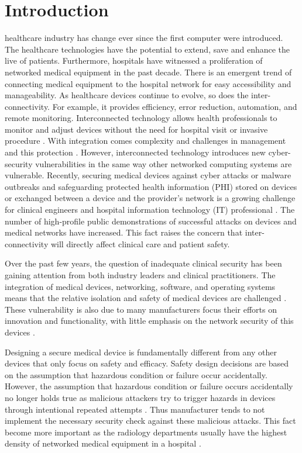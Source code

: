 \documentclass[pdf,bookmarks,colorlinks=true]{IEEEtran}
\begin{document}
\section{Introduction}
 healthcare industry has change ever since the first computer were introduced. The healthcare technologies have the potential to extend, save and enhance the live of patients. Furthermore, hospitals have witnessed a proliferation of networked medical equipment in the past decade. There is an emergent trend of connecting medical equipment to the hospital network for easy accessibility and manageability. As healthcare devices continue to evolve, so does the inter-connectivity. For example, it provides efficiency, error reduction, automation, and remote monitoring. Interconnected technology allows health professionals to monitor and adjust devices without the need for hospital visit or invasive procedure \cite{coventry2018cybersecurity}. With integration comes complexity and challenges in management and this protection \cite{williams2015cybersecurity}. However, interconnected technology introduces new cyber-security vulnerabilities in the same way other networked computing systems are vulnerable. Recently, securing medical devices against cyber attacks or malware outbreaks and safeguarding protected health information (PHI) stored on devices or exchanged between a device and the provider's network is a growing challenge for clinical engineers and hospital information technology (IT) professional \cite{wirth2011cybercrimes}. The number of high-profile public demonstrations of successful attacks on devices and medical networks have increased. This fact raises the concern that inter-connectivity will directly affect clinical care and patient safety. \par
Over the past few years, the question of inadequate clinical security has been gaining attention from both industry leaders and clinical practitioners. The integration of medical devices, networking, software, and operating systems means that the relative isolation and safety of medical devices are challenged \cite{williams2015cybersecurity}. These vulnerability is also due to many manufacturers focus their efforts on innovation and functionality, with little emphasis on the network security of this devices \cite{moses2015lack}. \par
Designing a secure medical device is fundamentally different from  any other devices that only focus on safety and efficacy. Safety design decisions are based on the assumption that hazardous condition or failure occur accidentally. However, the assumption that hazardous condition or failure occurs accidentally no longer holds true as malicious attackers try to trigger hazards in devices through intentional repeated attempts \cite{Ray}. Thus manufacturer tends to not implement the necessary security check against these malicious attacks. This fact become more important as the radiology departments usually have the highest density of networked medical equipment in a hospital \cite{moses2015lack}. 
\end{document}
